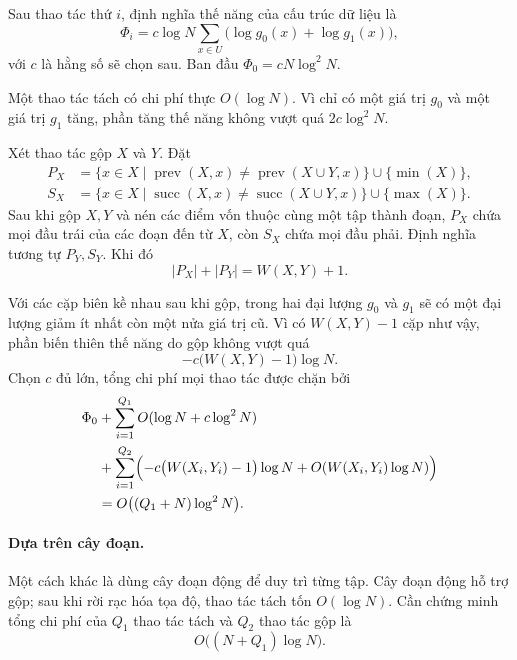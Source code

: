 \documentclass[11pt]{article}
\begin{document}
Sau thao tác thứ \(i\), định nghĩa thế năng của cấu trúc dữ liệu là
\[
  \Phi_i=c\log N\sum_{x\in U}\bigl(\log g_0(x)+\log g_1(x)\bigr),
\]
với \(c\) là hằng số sẽ chọn sau. Ban đầu
\(\Phi_0=cN\log^2N\).

Một thao tác tách có chi phí thực \(O(\log N)\). Vì chỉ có một giá trị \(g_0\)
và một giá trị \(g_1\) tăng, phần tăng thế năng không vượt quá \(2c\log^2N\).

Xét thao tác gộp \(X\) và \(Y\). Đặt
\[
\begin{aligned}
P_X&=\{x\in X\mid \operatorname{prev}(X,x)\ne
      \operatorname{prev}(X\cup Y,x)\}\cup\{\min(X)\},\\
S_X&=\{x\in X\mid \operatorname{succ}(X,x)\ne
      \operatorname{succ}(X\cup Y,x)\}\cup\{\max(X)\}.
\end{aligned}
\]
Sau khi gộp \(X,Y\) và nén các điểm vốn thuộc cùng một tập thành đoạn,
\(P_X\) chứa mọi đầu trái của các đoạn đến từ \(X\), còn \(S_X\) chứa mọi đầu
phải. Định nghĩa tương tự \(P_Y,S_Y\). Khi đó
\[
  |P_X|+|P_Y|=W(X,Y)+1.
\]

Với các cặp biên kề nhau sau khi gộp, trong hai đại lượng \(g_0\) và \(g_1\) sẽ
có một đại lượng giảm ít nhất còn một nửa giá trị cũ. Vì có \(W(X,Y)-1\) cặp
như vậy, phần biến thiên thế năng do gộp không vượt quá
\[
  -c\bigl(W(X,Y)-1\bigr)\log N.
\]
Chọn \(c\) đủ lớn, tổng chi phí mọi thao tác được chặn bởi
\[
\begin{aligned}
\Phi_0
&+\sum_{i=1}^{Q_1}O(\log N+c\log^2N)\\
&+\sum_{i=1}^{Q_2}
\Bigl(-c\bigl(W(X_i,Y_i)-1\bigr)\log N
      +O(W(X_i,Y_i)\log N)\Bigr)\\
&=O\bigl((Q_1+N)\log^2N\bigr).
\end{aligned}
\]

\paragraph{Dựa trên cây đoạn.}
Một cách khác là dùng cây đoạn động để duy trì từng tập. Cây đoạn động hỗ trợ
gộp; sau khi rời rạc hóa tọa độ, thao tác tách tốn \(O(\log N)\). Cần chứng
minh tổng chi phí của \(Q_1\) thao tác tách và \(Q_2\) thao tác gộp là
\[
  O\bigl((N+Q_1)\log N\bigr).
\]
\end{document}
